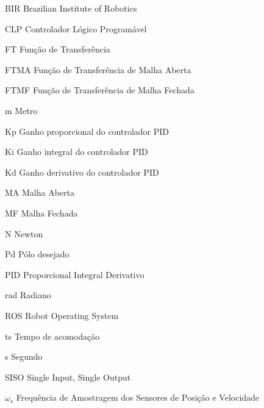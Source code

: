 \documentclass[12pt,oneside,a4paper, chapter=TITLE, section = TITLE, english, brazil]{abntex2}
\begin{document}
\begin{siglas}

  \item [BIR] Brazilian Institute of Robotics
  
  \item [CLP] Controlador Lógico Programável
  
  \item [FT] Função de Transferência
  
  \item [FTMA] Função de Transferência de Malha Aberta
  
  \item [FTMF] Função de Transferência de Malha Fechada
  
  \item [m] Metro
  
  \item [Kp] Ganho proporcional do controlador PID
  
  \item [Ki] Ganho integral do controlador PID
  
  \item [Kd] Ganho derivativo do controlador PID
  
  \item [MA] Malha Aberta
  
  \item [MF] Malha Fechada
  
  \item [N] Newton
  
  \item [Pd] Pólo desejado
  
  \item [PID] Proporcional Integral Derivativo
  
  \item [rad] Radiano
  
  \item [ROS] Robot Operating System
  
  \item [ts] Tempo de acomodação
  
  \item [s] Segundo
  
  \item [SISO] Single Input, Single Output
  
  \item [$\omega$$_{s}$] Frequência de Amostragem dos Sensores de Posição e Velocidade
      
  \end{siglas}
\end{document}

